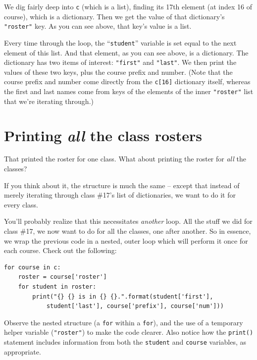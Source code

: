 \begin{compactenum}

\item We dig fairly deep into \texttt{c} (which is a list), finding its 17th
element (at index 16 of course), which is a dictionary. Then we get the value
of that dictionary's \texttt{"roster"} key. As you can see above, that key's
value is a list.

\item Every time through the loop, the ``\texttt{student}'' variable is set
equal to the next element of this list. And that element, as you can see above,
is a dictionary. The dictionary has two items of interest: \texttt{"first"} and
\texttt{"last"}. We then print the values of these two keys, plus the course
prefix and number. (Note that the course prefix and number come directly from
the \texttt{c[16]} dictionary itself, whereas the first and last names come
from keys of the elements of the inner \texttt{"roster"} list that we're
iterating through.)

\end{compactenum}

\section{Printing \textit{all} the class rosters}

That printed the roster for one class. What about printing the roster for
\textit{all} the classes?

If you think about it, the structure is much the same -- except that instead of
merely iterating through class \#17's list of dictionaries, we want to do it
for every class.


You'll probably realize that this necessitates \textit{another} loop. All the
stuff we did for class \#17, we now want to do for all the classes, one after
another. So in essence, we wrap the previous code in a nested, outer loop which
will perform it once for each course. Check out the following:

\begin{Verbatim}[fontsize=\footnotesize,samepage=true,frame=single,framesep=3mm]
for course in c:
    roster = course['roster']
    for student in roster:
        print("{} {} is in {} {}.".format(student['first'], 
            student['last'], course['prefix'], course['num'])) 
\end{Verbatim}

Observe the nested structure (a \texttt{for} within a \texttt{for}), and the
use of a temporary helper variable (\texttt{"roster"}) to make the code
clearer. Also notice how the \texttt{print()} statement includes information
from both the \texttt{student} and \texttt{course} variables, as appropriate.

